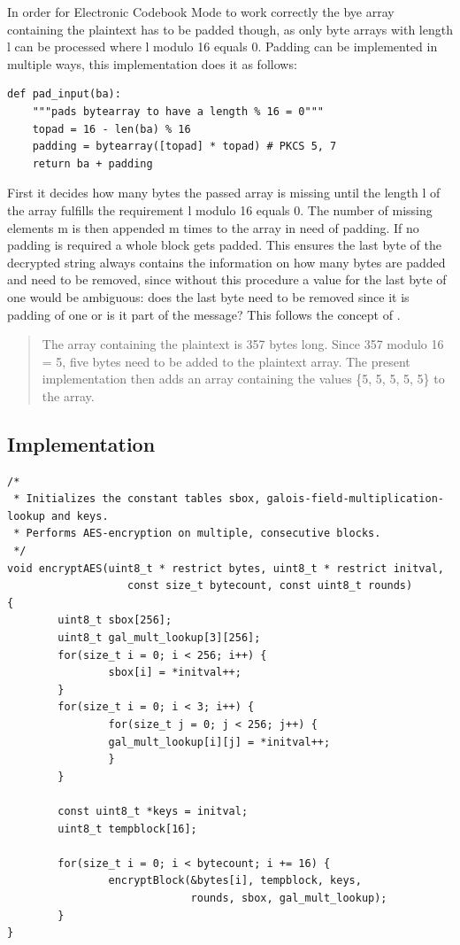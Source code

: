 In order for Electronic Codebook Mode to work correctly the bye array
containing the plaintext has to be padded though, as only byte arrays
with length l can be processed where l modulo 16 equals 0. Padding can
be implemented in multiple ways, this implementation does it as follows:

\begin{lstlisting}
def pad_input(ba):
    """pads bytearray to have a length % 16 = 0"""
    topad = 16 - len(ba) % 16
    padding = bytearray([topad] * topad) # PKCS 5, 7
    return ba + padding
\end{lstlisting}

First it decides how many bytes the passed array is missing until the
length l of the array fulfills the requirement l modulo 16 equals 0. The
number of missing elements m is then appended m times to the array in
need of padding. If no padding is required a whole block gets padded.
This ensures the last byte of the decrypted string always contains the
information on how many bytes are padded and need to be removed, since
without this procedure a value for the last byte of one would be
ambiguous: does the last byte need to be removed since it is padding of
one or is it part of the message? This follows the concept of \cite[ch. 10.3 Note 2]{RFC2315}.

\begin{quote}
The array containing the plaintext is 357 bytes long. Since 357 modulo 16 = 5,
five bytes need to be added to the plaintext array. The present
implementation then adds an array containing the values \{5, 5, 5, 5,
5\} to the array.
\end{quote}

\hypertarget{implementation-6}{%
\subsection{Implementation}\label{implementation-6}}

\begin{lstlisting}
/*
 * Initializes the constant tables sbox, galois-field-multiplication-lookup and keys.
 * Performs AES-encryption on multiple, consecutive blocks.
 */
void encryptAES(uint8_t * restrict bytes, uint8_t * restrict initval,
                   const size_t bytecount, const uint8_t rounds)
{
        uint8_t sbox[256];
        uint8_t gal_mult_lookup[3][256];
        for(size_t i = 0; i < 256; i++) {
                sbox[i] = *initval++;
        }
        for(size_t i = 0; i < 3; i++) {
                for(size_t j = 0; j < 256; j++) {
                gal_mult_lookup[i][j] = *initval++;
                }
        }

        const uint8_t *keys = initval;
        uint8_t tempblock[16];

        for(size_t i = 0; i < bytecount; i += 16) {
                encryptBlock(&bytes[i], tempblock, keys,
                             rounds, sbox, gal_mult_lookup);
        }
}
\end{lstlisting}

